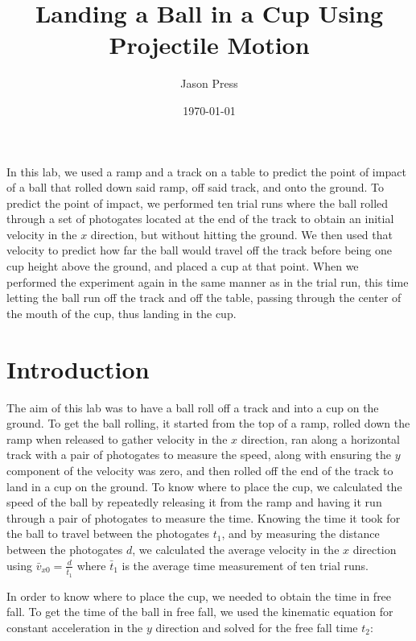 \documentclass[12pt]{article}
\author{Jason Press}
\date{\today}
\title{Landing a Ball in a Cup Using Projectile Motion}
\begin{document}
\maketitle
\begin{ABSTRACT}


In this lab, we used a ramp and a track on a table to predict the point of impact of a ball that rolled down said ramp, off said track, and onto the ground. To predict the point of impact, we performed ten trial runs where the ball rolled through a set of photogates located at the end of the track to obtain an initial velocity in the \(x\) direction, but without hitting the ground. We then used that velocity to predict how far the ball would travel off the track before being one cup height above the ground, and placed a cup at that point. When we performed the experiment again in the same manner as in the trial run, this time letting the ball run off the track and off the table, passing through the center of the mouth of the cup, thus landing in the cup.
\end{ABSTRACT}
\section{Introduction}
\label{sec:org9969c38}

The aim of this lab was to have a ball roll off a track and into a cup on the ground. To get the ball rolling, it started from the top of a ramp, rolled down the ramp when released to gather velocity in the \(x\) direction, ran along a horizontal track with a pair of photogates to measure the speed, along with ensuring the \(y\) component of the velocity was zero, and then rolled off the end of the track to land in a cup on the ground. To know where to place the cup, we calculated the speed of the ball by repeatedly releasing it from the ramp and having it run through a pair of photogates to measure the time. Knowing the time it took for the ball to travel between the photogates \(t_1\), and by measuring the distance between the photogates \(d\), we calculated the average velocity in the \(x\) direction using \(\bar{v}_{x0} = \frac{d}{\bar{t}_{1}}\) where \(\bar{t}_{1}\) is the average time measurement of ten trial runs.

In order to know where to place the cup, we needed to obtain the time in free fall. To get the time of the ball in free fall, we used the kinematic equation for constant acceleration in the \(y\) direction and solved for the free fall time \(t_{2}\):
\end{document}
